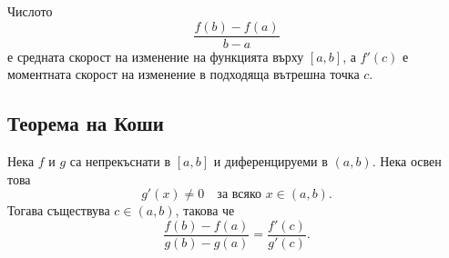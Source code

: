 \begin{remark}
Числото
\[
\frac{f(b)-f(a)}{b-a}
\]
е средната скорост на изменение на функцията върху $[a,b]$, а $f'(c)$ е моментната скорост на изменение в подходяща вътрешна точка $c$.
\end{remark}

\subsection{Теорема на Коши}\label{s:32.2.3}

\begin{keythm}
Нека $f$ и $g$ са непрекъснати в $[a,b]$ и диференцируеми в $(a,b)$. Нека освен това
\[
g'(x)\ne 0
\quad\text{за всяко }x\in(a,b).
\]
Тогава съществува $c\in(a,b)$, такова че
\[
\frac{f(b)-f(a)}{g(b)-g(a)}
=
\frac{f'(c)}{g'(c)}.
\]
\end{keythm}

